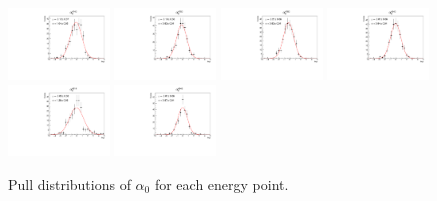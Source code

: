 \begin{figure}[h]
    \includegraphics[width=0.24\textwidth]{figure/io_full_sim/polarization/pull_polarization_alpha0_4740.pdf}
    \includegraphics[width=0.24\textwidth]{figure/io_full_sim/polarization/pull_polarization_alpha0_4750.pdf}
    \includegraphics[width=0.24\textwidth]{figure/io_full_sim/polarization/pull_polarization_alpha0_4780.pdf}
    \includegraphics[width=0.24\textwidth]{figure/io_full_sim/polarization/pull_polarization_alpha0_4840.pdf}
    \includegraphics[width=0.24\textwidth]{figure/io_full_sim/polarization/pull_polarization_alpha0_4914.pdf}
    \includegraphics[width=0.24\textwidth]{figure/io_full_sim/polarization/pull_polarization_alpha0_4946.pdf}
    \caption{Pull distributions of $\alpha_0$ for each energy point.}
\label{fig:io_wo_bkg_pull_alpha0}
\end{figure}

